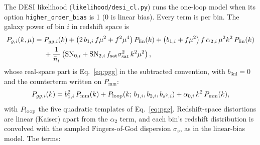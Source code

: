 \documentclass[11pt]{article}
\newcommand{\bthree}{b_{3\mathrm{nl}}} %
\newcommand{\plin}{P_{\mathrm{lin}}}
\newcommand{\pnl}{P_{\mathrm{mm}}}
\begin{document}
The DESI likelihood (\texttt{likelihood/desi\_cl.py}) runs the one-loop
model when its option \texttt{higher\_order\_bias} is 1 (0 is linear
bias).  Every term is per bin.  The galaxy power of bin $i$ in redshift
space is
\begin{align}
P_{g,i}(k,\mu) ={}& P_{gg,i}(k)
 + \left(2\,b_{1,i}\,f\mu^2 + f^2\mu^4\right)\plin(k)
 + \left(b_{1,i} + f\mu^2\right) f\,\alpha_{2,i}\,\mu^2 k^2\,\plin(k)
 \nonumber\\
&+ \frac{1}{\bar{n}_i}\left(\mathrm{SN}_{0,i}
 + \mathrm{SN}_{2,i}\,f_{\rm sat}\sigma_{\rm sat}^2\,k^2\mu^2\right) ,
\label{eq:model}
\end{align}
whose real-space part is Eq.~\eqref{eq:pgg} in the subtracted
convention, with $\bthree = 0$ and the counterterm written on $\pnl$:
\begin{equation}
P_{gg,i}(k) = b_{1,i}^2\,\pnl(k)
 + P_{\rm loop}(k;\, b_{1,i}, b_{2,i}, b_{s^2,i})
 + \alpha_{0,i}\,k^2\,\pnl(k) ,
\label{eq:model-real}
\end{equation}
with $P_{\rm loop}$ the five quadratic templates of Eq.~\eqref{eq:pgg}.
Redshift-space distortions are linear (Kaiser) apart from the
$\alpha_2$ term, and each bin's redshift distribution is convolved
with the sampled Fingers-of-God dispersion $\sigma_v$, as in the
linear-bias model.  The terms:
\end{document}
